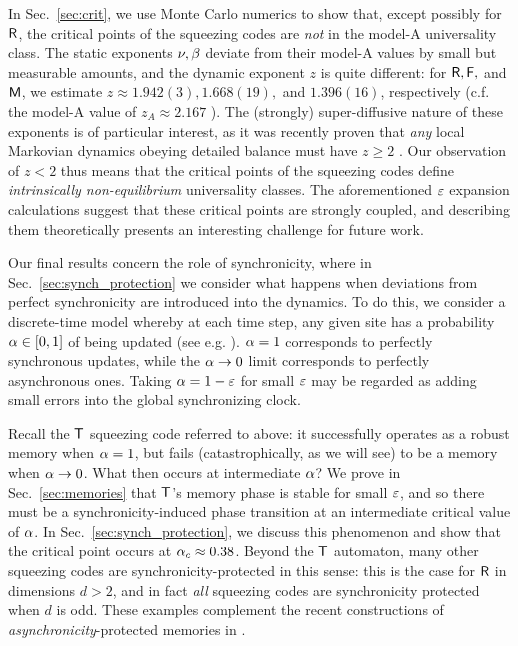 \documentclass[pra,aps,twocolumn,groupedaddress,superscriptaddress,nofootinbib,preprintnumbers]{revtex4-2}
\begin{document}
	In Sec.~\ref{sec:crit}, we use Monte Carlo numerics to show that, except possibly for  $\mathsf{R}$, the critical points of the squeezing codes are {\it not} in the model-A universality class. The static exponents $\nu,\beta$ deviate from their model-A values by small but measurable amounts, and the dynamic exponent $z$ is quite different: for $\mathsf{R},\mathsf{F},$ and $\mathsf{M}$, we estimate $z\approx 1.942(3), 1.668(19),$ and $1.396(16)$, respectively (c.f. the model-A value of $z_A \approx 2.167$ \cite{adzhemyan2022dynamic,nightingale1996dynamic}). The (strongly) super-diffusive nature of these exponents is of particular interest, as it was recently proven that {\it any} local Markovian dynamics obeying detailed balance must have $z\geq 2$ \cite{masaoka2024rigorous}. Our observation of $z<2$ thus means that the critical points of the squeezing codes define {\it intrinsically non-equilibrium} universality classes. The aforementioned $\varepsilon$ expansion calculations suggest that these critical points are strongly coupled, and describing them theoretically presents an interesting challenge for future work. 
	
	
	Our final results concern the role of synchronicity, where in Sec.~\ref{sec:synch_protection} we consider what happens when deviations from perfect synchronicity are introduced into the dynamics. To do this, we consider a discrete-time model whereby at each time step, any given site has a probability $\alpha \in [0,1]$ of being updated (see e.g. \cite{fates2007asynchronism,pajouheshgar2025exploring}). $\alpha=1$ corresponds to perfectly synchronous updates, while the $\alpha \rightarrow 0$ limit corresponds to perfectly asynchronous ones. Taking $\alpha = 1-\varepsilon$ for small $\varepsilon$ may be regarded as adding small errors into the global synchronizing clock. 
	
	Recall the $\mathsf{T}$ squeezing code referred to above: it successfully operates as a robust memory when $\alpha=1$, but fails (catastrophically, as we will see) to be a memory when $\alpha \rightarrow 0$. What then occurs at intermediate $\alpha$? We prove in Sec.~\ref{sec:memories} that $\mathsf{T}$'s memory phase is stable for small $\varepsilon$, and so there must be a synchronicity-induced phase transition at an intermediate critical value of $\alpha$. In Sec.~\ref{sec:synch_protection}, we discuss this phenomenon and show that the critical point occurs at $\alpha_c \approx 0.38$. 
	Beyond the $\mathsf{T}$ automaton, many other squeezing codes are synchronicity-protected in this sense: this is the case for $\mathsf{R}$ in dimensions $d>2$, and in fact {\it all} squeezing codes are synchronicity protected when $d$ is odd. These examples complement the recent constructions of {\it asynchronicity}-protected memories in  \cite{pajouheshgar2025exploring}. 
	
\end{document}
